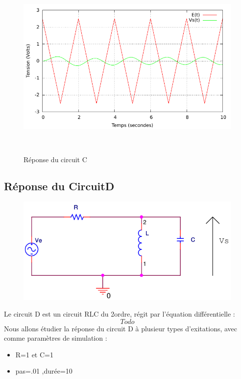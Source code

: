 \documentclass[a4paper,11pt]{article}
\begin{document}
\begin{figure}[h!]
\begin{minipage}[b]{0.5\linewidth}
   \end{minipage}
  \begin{minipage}[b]{0.5\linewidth}   
      \centering \includegraphics[scale=.68]{CCtriangle.pdf}
   \end{minipage}\\
 \caption{Réponse du circuit C}
\end{figure}

\newpage
  \subsection{Réponse du CircuitD}
  
\begin{figure}[H]
	 \begin{center}
	\includegraphics[scale=.5]{circuitD}
	\end{center}
      \end{figure}
   Le circuit D est un circuit RLC du 2\ieme ordre, régit par l'équation différentielle :
   \begin{equation*}
    Todo
   \end{equation*}
  Nous allons étudier la réponse du circuit D à plusieur types d'exitations, avec comme paramètres de simulation :  \\
  \begin{itemize}
   \item R=1 et C=1
   \item pas=.01 ,durée=10 
  \end{itemize}
\end{document}
